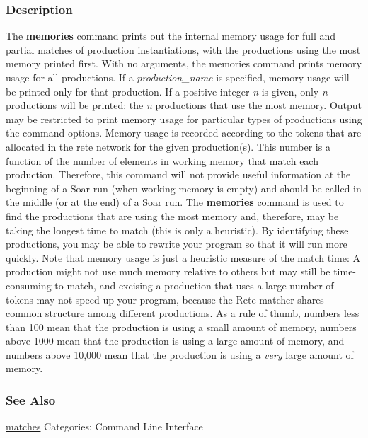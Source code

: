 \subsubsection*{Description}
 The \textbf{memories}
 command prints out the internal memory usage for full and partial matches of production instantiations, with the productions using the most memory printed first. With no arguments, the memories command prints memory usage for all productions. If a \emph{production\_name}
 is specified, memory usage will be printed only for that production. If a positive integer \emph{n}
 is given, only \emph{n}
 productions will be printed: the \emph{n}
 productions that use the most memory. Output may be restricted to print memory usage for particular types of productions using the command options. 
 Memory usage is recorded according to the tokens that are allocated in the rete network for the given production(s). This number is a function of the number of elements in working memory that match each production. Therefore, this command will not provide useful information at the beginning of a Soar run (when working memory is empty) and should be called in the middle (or at the end) of a Soar run. 
 The \textbf{memories}
 command is used to find the productions that are using the most memory and, therefore, may be taking the longest time to match (this is only a heuristic). By identifying these productions, you may be able to rewrite your program so that it will run more quickly. Note that memory usage is just a heuristic measure of the match time: A production might not use much memory relative to others but may still be time-consuming to match, and excising a production that uses a large number of tokens may not speed up your program, because the Rete matcher shares common structure among different productions. 
 As a rule of thumb, numbers less than 100 mean that the production is using a small amount of memory, numbers above 1000 mean that the production is using a large amount of memory, and numbers above 10,000 mean that the production is using a \emph{very}
 large amount of memory. 
\subsubsection*{See Also}
\hyperref[matches]{matches}  Categories: Command Line Interface

